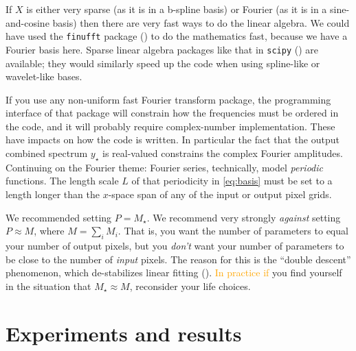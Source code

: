 \documentclass[modern, linenumbers]{aastex631}
\newcommand{\modified}[1]{\textcolor{orange}{#1}}
\begin{document}
If $X$ is either very sparse (as it is in a b-spline basis) or Fourier (as it is in a sine-and-cosine basis) then there are very fast ways to do the linear algebra.
We could have used the \texttt{finufft} package (\citealt{finufft}) to do the mathematics fast, because we have a Fourier basis here.
Sparse linear algebra packages like that in \texttt{scipy} (\citealt{scipy}) are available; they would similarly speed up the code when using spline-like or wavelet-like bases.

If you use any non-uniform fast Fourier transform package, the programming interface of that package will constrain how the frequencies must be ordered in the code, and it will probably require complex-number implementation.
These have impacts on how the code is written.
In particular the fact that the output combined spectrum $y_\star$ is real-valued constrains the complex Fourier amplitudes.
Continuing on the Fourier theme:
Fourier series, technically, model \emph{periodic} functions.
The length scale $L$ of that periodicity in \eqref{eq:basis} must be set to a length longer than the $x$-space span of any of the input or output pixel grids.

We recommended setting $P=M_\star$.
We recommend very strongly \emph{against} setting $P\approx M$, where $M=\sum_i M_i$.
That is, you want the number of parameters to equal your number of output pixels, but you \emph{don't} want your number of parameters to be close to the number of \emph{input} pixels.
The reason for this is the ``double descent'' phenomenon, which de-stabilizes linear fitting (\citealt{doubledescent}).
\modified{In practice if}
you find yourself in the situation that $M_\star\approx M$, reconsider your life choices.

\section{Experiments and results}\label{sec:results}
\end{document}

